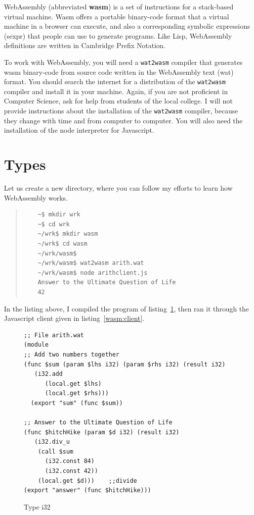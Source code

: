 \documentclass[a4paper,12pt]{book}
\begin{document}
WebAssembly (abbreviated {\bf wasm}) is a set of instructions
for a stack-based virtual machine. Wasm offers a portable
binary-code format that a virtual machine in a browser
can execute, and also a corresponding symbolic
expressions (sexpr) that people can use to generate
programs. Like Lisp, WebAssembly definitions are written
in Cambridge Prefix Notation.

To work with WebAssembly, you will need a \verb|wat2wasm|
compiler that generates wasm binary-code from source
code written in the WebAssembly text (wat) format.
You should search the internet for a distribution of
the \verb|wat2wasm| compiler and install it in your
machine. Again, if you are not proficient in Computer
Science, ask for help from students of the local college.
I will not provide instructions about the installation
of the \verb|wat2wasm| compiler, because they change
with time and from computer to computer. You will also
need the installation of the node interpreter for
Javascript.


\section{Types}

Let us create a new directory, where you can follow my
efforts to learn how WebAssembly works.

\begin{quote}
  \begin{verbatim}
    ~$ mkdir wrk
    ~$ cd wrk
    ~/wrk$ mkdir wasm
    ~/wrk$ cd wasm
    ~/wrk/wasm$
    ~/wrk/wasm$ wat2wasm arith.wat
    ~/wrk/wasm$ node arithclient.js
    Answer to the Ultimate Question of Life
    42
  \end{verbatim}
\end{quote}
In the listing above, I compiled the program of
listing~\ref{wasm:i32}, then ran it through the
Javascript client given in listing~\ref{wasm:client}.


\begin{figure}[!h]
\begin{verbatim}
;; File arith.wat
(module
;; Add two numbers together
(func $sum (param $lhs i32) (param $rhs i32) (result i32)
   (i32.add
      (local.get $lhs)
      (local.get $rhs)))
  (export "sum" (func $sum))

;; Answer to the Ultimate Question of Life
(func $hitchHike (param $d i32) (result i32)
   (i32.div_u
    (call $sum
      (i32.const 84)
      (i32.const 42))  
    (local.get $d)))    ;;divide
(export "answer" (func $hitchHike)))
\end{verbatim}

\caption{Type i32}
\label{wasm:i32}
\end{figure}
\end{document}

